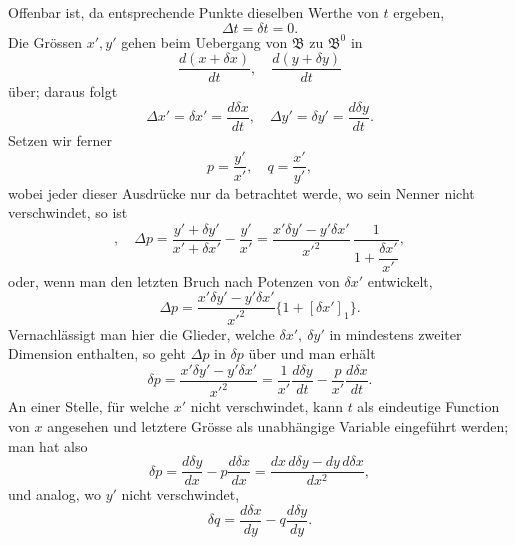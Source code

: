 \documentclass[11pt,a4paper,leqno]{article}
\begin{document}
Offenbar ist, da entsprechende Punkte dieselben Werthe von $t$ ergeben,
\[
 \Delta t=\delta t=0.
\]
Die Grössen $x',y'$ gehen beim Uebergang von $\mathfrak{B}$ zu $\mathfrak{B}^0$ in
\[
 \frac{d(x+\delta x)}{dt},\quad \frac{d(y+\delta y)}{dt}
\]
über; daraus folgt
\[
 \Delta x'=\delta x'=\frac{d\delta x}{dt},\quad
 \Delta y'=\delta y'=\frac{d\delta y}{dt}.
\]
Setzen wir ferner
\[
 p=\frac{y'}{x'},\quad q=\frac{x'}{y'},
\]
wobei jeder dieser Ausdrücke nur da betrachtet werde, wo sein Nenner nicht verschwindet, so ist
\[
 ,\quad
 \Delta p=\frac{y'+\delta y'}{x'+\delta x'}-\frac{y'}{x'}
 =\frac{x'\delta y'-y'\delta x'}{x'^2}\,\frac{1}{1+\dfrac{\delta x'}{x'}},
\]
oder, wenn man den letzten Bruch nach Potenzen von $\delta x'$ entwickelt,
\[
 \Delta p=\frac{x'\delta y'-y'\delta x'}{x'^2}\{1+[\delta x']_1\}.
\]
Vernachlässigt man hier die Glieder, welche $\delta x',\ \delta y'$ in mindestens zweiter Dimension enthalten, so geht $\Delta p$ in $\delta p$ über und man erhält
\[
 \delta p=\frac{x'\delta y'-y'\delta x'}{x'^2}=\frac{1}{x'}\frac{d\delta y}{dt}-\frac{p}{x'}\frac{d\delta x}{dt}.
\]
An einer Stelle, für welche $x'$ nicht verschwindet, kann $t$ als eindeutige Function von $x$ angesehen und letztere Grösse als unabhängige Variable eingeführt werden; man hat also
\[
 \delta p=\frac{d\delta y}{dx}-p\frac{d\delta x}{dx}
 =\frac{dx\,d\delta y-dy\,d\delta x}{dx^2},
\]
und analog, wo $y'$ nicht verschwindet,
\[
 \delta q=\frac{d\delta x}{dy}-q\frac{d\delta y}{dy}.
\]
\end{document}
